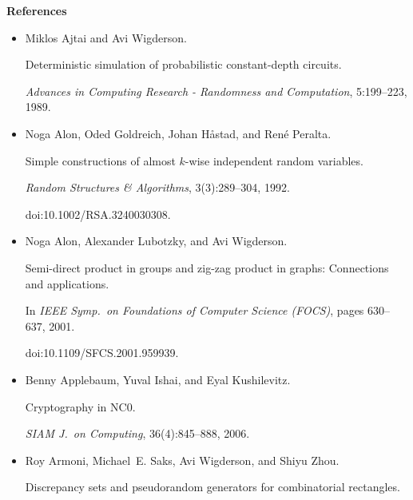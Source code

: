 \par\medskip\noindent\textbf{References}\par



\begin{itemize}


\item[] 
[1]

Miklos Ajtai and Avi Wigderson.


Deterministic simulation of probabilistic constant-depth circuits.


\emph{Advances in Computing Research - Randomness and Computation},
5:199–223, 1989.





\item[] 
[2]

Noga Alon, Oded Goldreich, Johan Håstad, and René Peralta.


Simple constructions of almost $k$-wise independent random
variables.


\emph{Random Structures \& Algorithms}, 3(3):289–304, 1992.


doi:10.1002/RSA.3240030308.





\item[] 
[3]

Noga Alon, Alexander Lubotzky, and Avi Wigderson.


Semi-direct product in groups and zig-zag product in graphs:
Connections and applications.


In \emph{IEEE Symp. on Foundations of Computer Science (FOCS)}, pages
630–637, 2001.


doi:10.1109/SFCS.2001.959939.





\item[] 
[4]

Benny Applebaum, Yuval Ishai, and Eyal Kushilevitz.


Cryptography in NC0.


\emph{SIAM J. on Computing}, 36(4):845–888, 2006.





\item[] 
[5]

Roy Armoni, Michael E. Saks, Avi Wigderson, and Shiyu Zhou.


Discrepancy sets and pseudorandom generators for combinatorial
rectangles.



\end{itemize}
